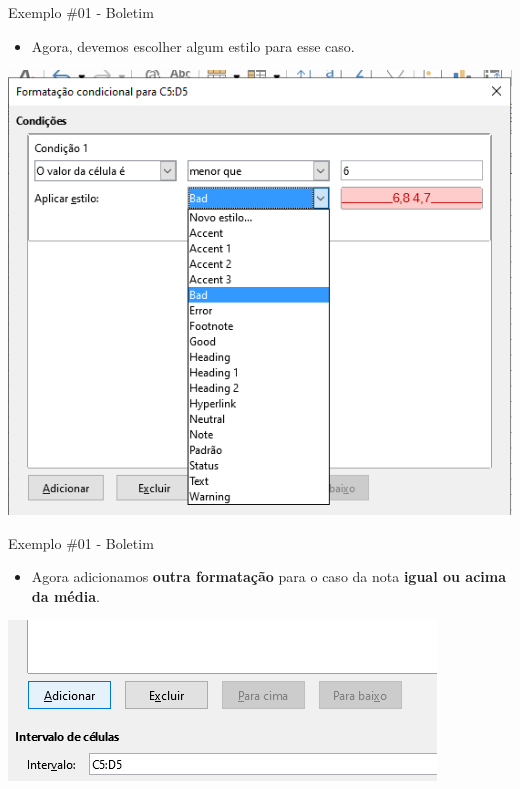 \begin{frame}{Exemplo \#01 - Boletim}
	\begin{block}{}
		\begin{itemize}
			\item Agora, devemos escolher algum estilo para esse caso.
		\end{itemize}
	\end{block}
	
	\centering
	\includegraphics[width=0.6\linewidth]{Figuras/Ch06/fig44.8}
\end{frame}


\begin{frame}{Exemplo \#01 - Boletim}
	\begin{block}{}
		\begin{itemize}
			\item Agora adicionamos \textbf{outra formatação} para o caso da nota \textbf{igual ou acima da média}.
		\end{itemize}
	\end{block}
	
	\bigskip
	
	\centering
	\includegraphics[width=0.8\linewidth]{Figuras/Ch06/fig44.9}
\end{frame}


